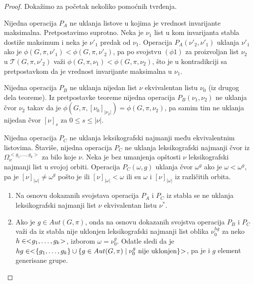 \documentclass[12pt,oneside]{memoir}
\theoremstyle{definition}
\begin{document}
  \begin{proof}
	  Dokažimo za početak nekoliko pomoćnih tvrđenja.

	  Nijedna operacija $P_A$ ne uklanja listove u kojima je vrednost
	  invarijante maksimalna. Pretpostavimo suprotno. Neka je $\nu_1$ list u
	  kom invarijanta stabla dostiže maksimum i neka je $\nu'_1$ predak od
	  $\nu_1$. Operacija $P_A(\nu'_2, \nu'_1)$ uklanja $\nu'_1$ ako je $\phi(G,
	  \pi, \nu'_1) < \phi(G, \pi, \nu'_2)$, pa po svojstvu $(\phi1)$ za
	  proizvoljan list $\nu_2$ u $\mathcal{T}(G, \pi, \nu'_2)$ važi $\phi(G,
	  \pi, \nu_1) < \phi(G, \pi, \nu_2)$, što je u kontradikciji sa
	  pretpostavkom da je vrednost invarijante maksimalna u $\nu_1$.

	  Nijedna operacija $P_B$ ne uklanja nijedan list $\nu$ ekvivalentan listu
	  $\nu_0$ (iz drugog dela teoreme). Iz pretpostavke teoreme nijedna
	  operacija $P_B(\nu_1, \nu_2)$ ne uklanja čvor $\nu_2$ takav da je
	  $\phi(G, \pi, [\nu_0]_{|\nu_2|}) = \phi(G, \pi, \nu_2)$, pa samim tim ne
	  uklanja nijedan čvor $[\nu]_{s}$ za $0 \leq s \leq |\nu|$.

	  Nijedna operacija $P_C$ ne uklanja leksikografski najmanji među
	  ekvivalentnim listovima. Štaviše, nijedna operacija $P_C$ ne uklanja
	  leksikografski najmanji čvor iz $\Omega_\nu^{<g_1, \dots, g_k>}$ za bilo
	  koje $\nu$. Neka je bez umanjenja opštosti $\nu$ leksikografski najmanji
	  list u svojoj orbiti. Operacija $P_C(\omega, g)$ uklanja čvor $\omega^g$
	  ako je $\omega < \omega^g$, pa je $[\nu]_{|\omega|} \neq \omega^g$ pošto
	  je ili $[\nu]_{|\omega|} < \omega$ ili su $\omega$ i $[\nu]_{|\omega|}$ iz
	  različitih orbita.
	  \begin{enumerate}
		  \item Na osnovu dokazanih svojstava operacija $P_A$ i $P_C$ iz stabla
			  se ne uklanja leksikografski najmanji list $\nu$ ekvivalentan
			  listu $\nu^*$.
		  \item Ako je $g \in Aut(G, \pi)$, onda na osnovu dokazanih svojstva
			  operacija $P_B$ i $P_C$ važi da iz stabla nije uklonjen
			  leksikografski najmanji list oblika $\nu_0^{hg}$ za neko $h \in <
			  \negmedspace g_1, \dots, g_k \negmedspace >$, izborom $\omega =
			  \nu_0^g$. Odatle sledi da je $hg \in < \negmedspace \{g_1, \dots,
			  g_k\} \cup \{g \in Aut(G, \pi) \mid \nu_0^g \text{ nije
			  uklonjen}\} \negmedspace >$, pa je i $g$ element generisane
			  grupe.
	  \end{enumerate}
  \end{proof}
\end{document}
